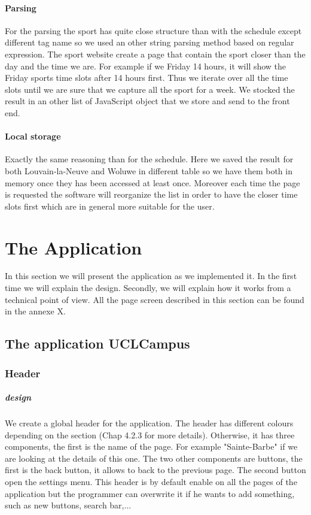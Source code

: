 \documentclass[11pt, a4paper]{report}
\begin{document}
\subsubsection{Parsing}
For the parsing the sport has quite close structure than with the schedule except different tag name so we used an other string parsing method based on regular expression. The sport website create a page that contain the sport closer than the day and the time we are. For example if we Friday 14 hours, it will show the Friday sports time slots after 14 hours first. Thus we iterate over all the time slots until we are sure that we capture all the sport for a week. We stocked the result in an other list of JavaScript object that we store and send to the front end.
\subsubsection{Local storage}
Exactly the same reasoning than for the schedule. Here we saved the result for both Louvain-la-Neuve and Woluwe in different table so we have them both in memory once they has been accessed at least once. Moreover each time the page is requested the software will reorganize the list in order to have the closer time slots first which are in general more suitable for the user. 

\newpage

\chapter{The Application}

In this section we will present the application as we implemented it. In the first time we will explain the design. Secondly, we will explain how it works from a technical point of view. All the page screen described in this section can be found in the annexe X.

\section{The application UCLCampus}

\subsection{Header}
\paragraph{design}
We create a global header for the application. The header has different colours depending on the section (Chap 4.2.3 for more details). Otherwise, it has three components, the first is the name of the page. For example "Sainte-Barbe" if we are looking at the details of this one. The two other components are buttons, the first is the back button, it allows to back to the previous page. The second button open the settings menu. This header is by default enable on all the pages of the application but the programmer can overwrite it if he wants to add something, such as new buttons, search bar,...
\end{document}
